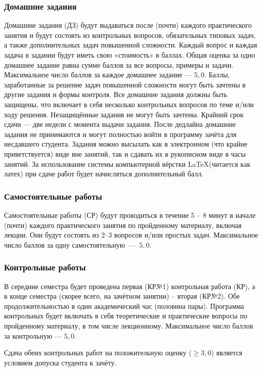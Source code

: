 \documentclass[11pt, a4paper]{article}
\theoremstyle{plain}
\theoremstyle{definition}
\theoremstyle{remark}
\renewcommand{\geq}{\ensuremath{\geqslant}}
\begin{document}
\subsubsection{Домашние задания}
Домашние задания (ДЗ) будут выдаваться после (почти) каждого практического занятия и будут
состоять из контрольных вопросов, обязательных типовых задач, а также дополнительных задач
повышенной сложности. Каждый вопрос и каждая задача в задании будут иметь свою «стоимость» в баллах.
Общая оценка за одно домашнее задание равна сумме баллов за все вопросы, примеры и задачи.
Максимальное число баллов за каждое домашнее задание --- $5,0$. Баллы, заработанные за решение задач
повышенной сложности могут быть зачтены в другие задания и формы контроля. Все домашние задания
должны быть защищены, что включает в себя несколько контрольных вопросов по теме и/или ходу решения.
Незащищённые задания не могут быть зачтены. Крайний срок сдачи --- две недели с момента выдачи
задания. После дедлайна домашние задания не принимаются и могут полностью войти в программу зачёта
для несдавшего студента. Задания можно высылать как в электронном (что крайне приветствуется) виде
вне занятий, так и сдавать их в рукописном виде в часы занятий. За использование системы
компьютерной вёрстки \LaTeX (читается как латех) при сдаче работ будет начисляться дополнительный балл.

\subsubsection{Самостоятельные работы}
Самостоятельные работы (СР) будут проводиться в течение 5 -- 8 минут в начале (почти) каждого
практического занятия по пройденному материалу, включая лекции. Они будут состоять из 2--3 вопросов
и/или простых задач. Максимальное число баллов за одну самостоятельную~---~$5,0$. 

\subsubsection{Контрольные работы}
В середине семестра будет проведена первая (КР№1) контрольная работа (КР), а в конце семестра
(скорее всего, на зачётном занятии) -- вторая (КР№2). Обе продолжительностью в один академический
час (половина пары). Программа
контрольных будет включать в себя теоретические и практические вопросы по пройденному материалу, в
том числе лекционному. Максимальное число баллов за контрольную --- $5,0$.\par
Сдача обеих контрольных работ на
положительную оценку ($\geq 3,0$) является условием допуска студента к зачёту.
\end{document}
